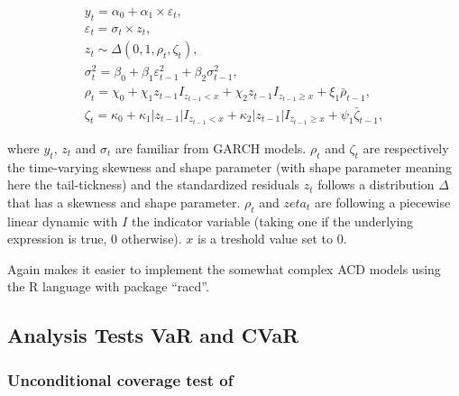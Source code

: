 \documentclass[a4paper, nobind]{templates/ociamthesis}
\begin{document}
\begin{equation}
\begin{array}{l}
y_{t}=\alpha_0 + \alpha_1 \times \varepsilon_{t}, \\
\varepsilon_{t}= \sigma_{t} \times z_{t}, \\
z_{t} \sim \Delta\left(0,1, \rho_{t}, \zeta_{t}\right), \\
\sigma_{t}^{2}=\beta_0+\beta_{1} \varepsilon_{t-1}^{2}+\beta_{2} \sigma_{t-1}^{2}, \\
\rho_{t}= \chi_{0}+\chi_{1} z_{t-1} I_{z_{t-1}<x}+\chi_{2} z_{t-1} I_{z_{t-1} \geqslant x}+\xi_{1} \bar{\rho}_{t-1},\\
\zeta_{t}=\kappa_{0}+\kappa_{1}\left|z_{t-1}\right| I_{z_{t-1}<x}+\kappa_{2}\left|z_{t-1}\right| I_{z_{t-1} \geqslant x}+\psi_{1} \bar{\zeta}_{t-1},
\end{array}
\label{eq:acd}
\end{equation}

\noindent where \(y_t\), \(z_t\) and \(\sigma_t\) are familiar from GARCH models. \(\rho_t\) and \(\zeta_t\) are respectively the time-varying skewness and shape parameter (with shape parameter meaning here the tail-tickness) and the standardized residuals \(z_t\) follows a distribution \(\Delta\) that has a skewness and shape parameter. \(\rho_t\) and \(zeta_t\) are following a piecewise linear dynamic with \(I\) the indicator variable (taking one if the underlying expression is true, 0 otherwise). \(x\) is a treshold value set to 0.

\noindent Again \textcite{ghalanos2016} makes it easier to implement the somewhat complex ACD models using the R language with package ``racd''.

\hypertarget{analysis-tests-var-and-cvar}{%
\subsection{Analysis Tests VaR and CVaR}\label{analysis-tests-var-and-cvar}}

\hypertarget{unconditional-coverage-test-of-kupiec1995}{%
\subsubsection{\texorpdfstring{Unconditional coverage test of \textcite{kupiec1995}}{Unconditional coverage test of @kupiec1995}}\label{unconditional-coverage-test-of-kupiec1995}}
\end{document}
